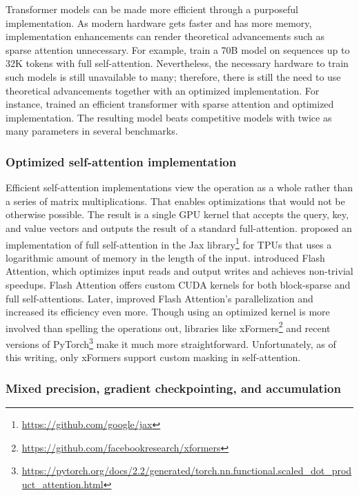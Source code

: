 Transformer models can be made more efficient through a purposeful
implementation. As modern hardware gets faster and has more memory,
implementation enhancements can render theoretical advancements such as sparse
attention unnecessary. For example, \cite{xiong2023effective} train a 70B model
on sequences up to 32K tokens with full self-attention. Nevertheless, the
necessary hardware to train such models is still unavailable to many;
therefore, there is still the need to use theoretical advancements together
with an optimized implementation. For instance, \cite{jiang2023mistral} trained
an efficient transformer with sparse attention and optimized
implementation. The resulting model beats competitive models with twice as many
parameters in several benchmarks.

\subsubsection{Optimized self-attention implementation}

Efficient self-attention implementations view the operation as a whole rather
than a series of matrix multiplications. That enables optimizations that would
not be otherwise possible. The result is a single GPU kernel that accepts the
query, key, and value vectors and outputs the result of a standard
full-attention. \cite{rabe2021self} proposed an implementation of full
self-attention in the Jax library\footnote{\url{https://github.com/google/jax}} for TPUs that uses a logarithmic amount of memory in the length of the input.
\cite{dao2022flashattention} introduced Flash Attention, which optimizes input reads and output writes and achieves non-trivial speedups. Flash
Attention offers custom CUDA kernels for both block-sparse and full
self-attentions. Later, \cite{dao2023flashattention} improved Flash Attention's
parallelization and increased its efficiency even more. Though using an optimized
kernel is more involved than spelling the operations out, libraries like
xFormers\footnote{\url{https://github.com/facebookresearch/xformers}} and
recent versions of
PyTorch\footnote{\url{https://pytorch.org/docs/2.2/generated/torch.nn.functional.scaled_dot_product_attention.html}}
make it much more straightforward. Unfortunately, as of this writing, only
xFormers support custom masking in self-attention.

\subsubsection{Mixed precision, gradient checkpointing, and accumulation}

